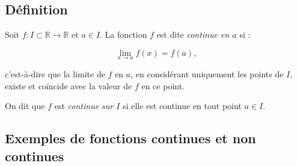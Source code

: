 \documentclass{report} %
\theoremstyle{definition}  %
\theoremstyle{plain} %
\theoremstyle{remark} %
\begin{document}
\subsection{Définition}

Soit \(f : I \subset \mathbb{R} \to \mathbb{R}\) et \(a \in I\).  
La fonction \(f\) est dite \emph{continue en \(a\)} si :

\[
\lim_{x \to a} f(x) = f(a),
\]

\noindent
c'est-à-dire que la limite de \(f\) en \(a\), en considérant uniquement
les points de \(I\), existe et coïncide avec la valeur de \(f\) en ce point.  

\noindent
On dit que \(f\) est \emph{continue sur \(I\)} si elle est continue en tout point \(a \in I\).


\subsection{Exemples de fonctions continues et non continues}
\end{document}
